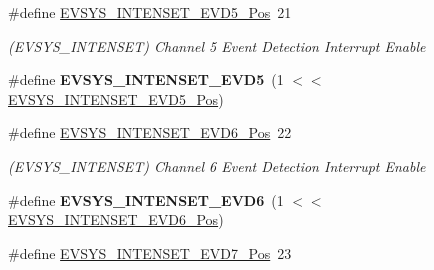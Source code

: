 \begin{DoxyCompactItemize}
\item 
\hypertarget{group___s_a_m_l21___e_v_s_y_s_ga42062ac94bf286d862f9d7f979032380}{}\#define \hyperlink{group___s_a_m_l21___e_v_s_y_s_ga42062ac94bf286d862f9d7f979032380}{E\+V\+S\+Y\+S\+\_\+\+I\+N\+T\+E\+N\+S\+E\+T\+\_\+\+E\+V\+D5\+\_\+\+Pos}~21\label{group___s_a_m_l21___e_v_s_y_s_ga42062ac94bf286d862f9d7f979032380}

\begin{DoxyCompactList}\small\item\em (E\+V\+S\+Y\+S\+\_\+\+I\+N\+T\+E\+N\+S\+E\+T) Channel 5 Event Detection Interrupt Enable \end{DoxyCompactList}\item 
\hypertarget{group___s_a_m_l21___e_v_s_y_s_gab3b2300602dd862366cef7a2bcfce2f7}{}\#define {\bfseries E\+V\+S\+Y\+S\+\_\+\+I\+N\+T\+E\+N\+S\+E\+T\+\_\+\+E\+V\+D5}~(1 $<$$<$ \hyperlink{group___s_a_m_l21___e_v_s_y_s_ga42062ac94bf286d862f9d7f979032380}{E\+V\+S\+Y\+S\+\_\+\+I\+N\+T\+E\+N\+S\+E\+T\+\_\+\+E\+V\+D5\+\_\+\+Pos})\label{group___s_a_m_l21___e_v_s_y_s_gab3b2300602dd862366cef7a2bcfce2f7}

\item 
\hypertarget{group___s_a_m_l21___e_v_s_y_s_ga74bcfeecac2b6a63942c70384bbf93c9}{}\#define \hyperlink{group___s_a_m_l21___e_v_s_y_s_ga74bcfeecac2b6a63942c70384bbf93c9}{E\+V\+S\+Y\+S\+\_\+\+I\+N\+T\+E\+N\+S\+E\+T\+\_\+\+E\+V\+D6\+\_\+\+Pos}~22\label{group___s_a_m_l21___e_v_s_y_s_ga74bcfeecac2b6a63942c70384bbf93c9}

\begin{DoxyCompactList}\small\item\em (E\+V\+S\+Y\+S\+\_\+\+I\+N\+T\+E\+N\+S\+E\+T) Channel 6 Event Detection Interrupt Enable \end{DoxyCompactList}\item 
\hypertarget{group___s_a_m_l21___e_v_s_y_s_ga5ba66c728a065f72b41a00d46072543c}{}\#define {\bfseries E\+V\+S\+Y\+S\+\_\+\+I\+N\+T\+E\+N\+S\+E\+T\+\_\+\+E\+V\+D6}~(1 $<$$<$ \hyperlink{group___s_a_m_l21___e_v_s_y_s_ga74bcfeecac2b6a63942c70384bbf93c9}{E\+V\+S\+Y\+S\+\_\+\+I\+N\+T\+E\+N\+S\+E\+T\+\_\+\+E\+V\+D6\+\_\+\+Pos})\label{group___s_a_m_l21___e_v_s_y_s_ga5ba66c728a065f72b41a00d46072543c}

\item 
\hypertarget{group___s_a_m_l21___e_v_s_y_s_ga6e76acb48a65a547fd7cdd6190b4dd37}{}\#define \hyperlink{group___s_a_m_l21___e_v_s_y_s_ga6e76acb48a65a547fd7cdd6190b4dd37}{E\+V\+S\+Y\+S\+\_\+\+I\+N\+T\+E\+N\+S\+E\+T\+\_\+\+E\+V\+D7\+\_\+\+Pos}~23\label{group___s_a_m_l21___e_v_s_y_s_ga6e76acb48a65a547fd7cdd6190b4dd37}


\end{DoxyCompactItemize}
